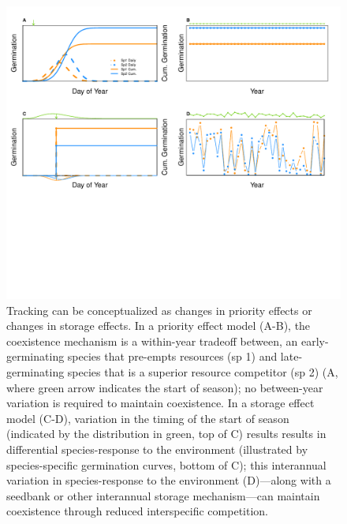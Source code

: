 \documentclass[11pt,letterpaper]{article}
\begin{document}
\begin{figure}[h!]
\centering
\includegraphics[width=1\textwidth]{..//..//..//R/graphs/conceptual/PriorityEff_BetHedge.pdf}
\caption{Tracking can be conceptualized as changes in priority effects or changes in storage effects.  In a priority effect model (A-B), the coexistence mechanism is a within-year tradeoff between, an early-germinating species that pre-empts resources (sp 1) and late-germinating species that is a superior resource competitor (sp 2) (A, where green arrow indicates the start of season); no between-year variation is required to maintain coexistence. In a storage effect model (C-D), variation in the timing of the start of season (indicated by the distribution in green, top of C) results results in differential species-response to the environment (illustrated by species-specific germination curves, bottom of C); this interannual variation in species-response to the environment (D)---along with a seedbank or other interannual storage mechanism---can maintain coexistence through reduced interspecific competition.}
\label{fig:conceptmodels} 
\end{figure}


\clearpage
\newpage


\end{document}
